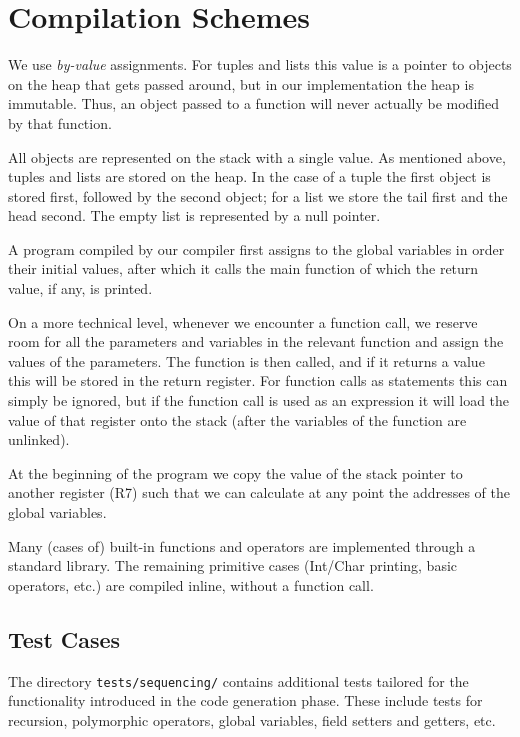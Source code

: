 \documentclass[a4paper]{article}
\begin{document}
\section{Compilation Schemes}

We use \emph{by-value} assignments.
For tuples and lists this value is a pointer to objects on the heap that gets passed around, but in our implementation the heap is immutable.
Thus, an object passed to a function will never actually be modified by that function.

All objects are represented on the stack with a single value.
As mentioned above, tuples and lists are stored on the heap.
In the case of a tuple the first object is stored first, followed by the second object; for a list we store the tail first and the head second.
The empty list is represented by a null pointer.

A program compiled by our compiler first assigns to the global variables in order their initial values, after which it calls the main function of which the return value, if any, is printed.

On a more technical level, whenever we encounter a function call, we reserve room for all the parameters and variables in the relevant function and assign the values of the parameters.
The function is then called, and if it returns a value this will be stored in the return register.
For function calls as statements this can simply be ignored, but if the function call is used as an expression it will load the value of that register onto the stack (after the variables of the function are unlinked).

At the beginning of the program we copy the value of the stack pointer to another register (R7) such that we can calculate at any point the addresses of the global variables.

Many (cases of) built-in functions and operators are implemented through a standard library.
The remaining primitive cases (Int/Char printing, basic operators, etc.) are compiled inline, without a function call.

\subsection{Test Cases}

The directory \verb|tests/sequencing/| contains additional tests tailored for the functionality introduced in the code generation phase.
These include tests for recursion, polymorphic operators, global variables, field setters and getters, etc.
\end{document}

